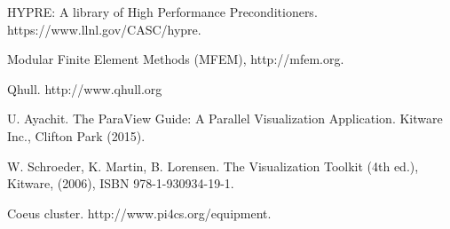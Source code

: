 \documentclass[12pt]{article}
\begin{document}
\begin{thebibliography}{100}
HYPRE: A library of High Performance Preconditioners. https://www.llnl.gov/CASC/hypre.

Modular Finite Element Methods (MFEM), http://mfem.org.

Qhull. http://www.qhull.org

U. Ayachit. The ParaView Guide: A Parallel Visualization Application. Kitware Inc., Clifton Park (2015).

W. Schroeder, K. Martin, B. Lorensen. The Visualization Toolkit (4th ed.), Kitware, (2006), ISBN 978-1-930934-19-1.

Coeus cluster. http://www.pi4cs.org/equipment.

\end{thebibliography}
\end{document}

